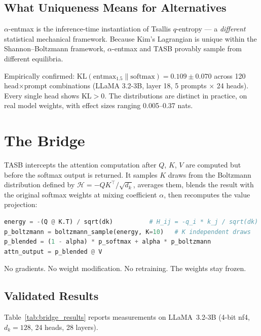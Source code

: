 \documentclass[11pt,a4paper]{article}
\begin{document}
\subsection{What Uniqueness Means for Alternatives}

$\alpha$-entmax \citep{peters2019sparse} is the inference-time instantiation of
Tsallis $q$-entropy --- a \emph{different} statistical mechanical framework.
Because Kim's Lagrangian is unique within the Shannon--Boltzmann framework,
$\alpha$-entmax and TASB provably sample from different equilibria.

Empirically confirmed: $\mathrm{KL}(\mathrm{entmax}_{1.5} \| \mathrm{softmax})
= 0.109 \pm 0.070$ across 120 head$\times$prompt combinations (LLaMA 3.2-3B,
layer 18, 5 prompts $\times$ 24 heads). Every single head shows $\mathrm{KL}>0$.
The distributions are distinct in practice, on real model weights, with effect
sizes ranging 0.005--0.37 nats.

\section{The Bridge}
\label{sec:bridge}

TASB intercepts the attention computation after $Q$, $K$, $V$ are computed but
before the softmax output is returned. It samples $K$ draws from the Boltzmann
distribution defined by $\mathcal{H} = -QK^\top/\sqrt{d_k}$, averages them,
blends the result with the original softmax weights at mixing coefficient $\alpha$,
then recomputes the value projection:

\begin{lstlisting}[language=Python, caption={TASB bridge (conceptual)}]
energy = -(Q @ K.T) / sqrt(dk)          # H_ij = -q_i * k_j / sqrt(dk)
p_boltzmann = boltzmann_sample(energy, K=10)   # K independent draws
p_blended = (1 - alpha) * p_softmax + alpha * p_boltzmann
attn_output = p_blended @ V
\end{lstlisting}

No gradients. No weight modification. No retraining. The weights stay frozen.

\subsection{Validated Results}

Table~\ref{tab:bridge_results} reports measurements on LLaMA~3.2-3B
\citep{metaai_llama32} (4-bit nf4, $d_k=128$, 24 heads, 28 layers).
\end{document}
